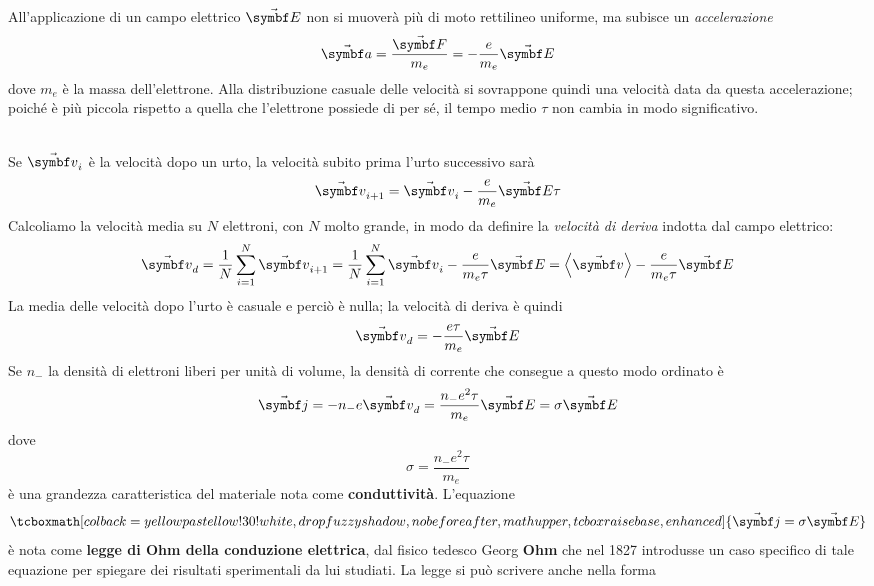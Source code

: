 \begin{minipage}{0.61\textwidth}
	 All'applicazione di un campo elettrico $\vba{E}$ non si muoverà più di moto rettilineo uniforme, ma subisce un \textit{accelerazione}
	\begin{equation*}
		\vba{a}=\frac{\vba{F}}{m_{e}}=-\frac{e}{m_{e}}\vba{E}
	\end{equation*}
	dove $m_e$ è la massa dell'elettrone. Alla distribuzione casuale delle velocità si sovrappone quindi una velocità data da questa accelerazione; poiché è più piccola rispetto a quella che l'elettrone possiede di per sé, il tempo medio $\tau$ non cambia in modo significativo.
\end{minipage}\\
 Se $\vba{v}_i$ è la velocità dopo un urto, la velocità subito prima l'urto successivo sarà
\begin{equation*}
	\vba{v}_{i+1}=\vba{v}_i-\frac{e}{m_{e}}\vba{E}\tau
\end{equation*}
Calcoliamo la velocità media su $N$ elettroni, con $N$ molto grande, in modo da definire la \textit{velocità di deriva} indotta dal campo elettrico:
\begin{equation*}
	\vba{v}_d=\frac{1}{N}\sum_{i=1}^{N}\vba{v}_{i+1}=\frac{1}{N}\sum_{i=1}^{N}\vba{v}_i-\frac{e}{m_{e}\tau}\vba{E}=\left<\vba{v}\right>-\frac{e}{m_{e}\tau}\vba{E}
\end{equation*}
La media delle velocità dopo l'urto è casuale e perciò è nulla; la velocità di deriva è quindi
\begin{equation}
	\vba{v}_d=-\frac{e\tau}{m_{e}}\vba{E}
\end{equation}
Se $n_{-}$ la densità di elettroni liberi per unità di volume, la densità di corrente che consegue a questo modo ordinato è
\begin{equation}
	\vba{j}=-n_{-}e\vba{v}_d=\frac{n_{-}e^2\tau}{m_{e}}\vba{E}=\sigma\vba{E}
\end{equation}
dove
\begin{equation*}
	\sigma=\frac{n_{-}e^2\tau}{m_{e}}
\end{equation*}
è una grandezza caratteristica del materiale nota come \textbf{conduttività}.
L'equazione
\begin{equation}
	\tcboxmath[colback=yellowpastellow!30!white,drop fuzzy shadow, nobeforeafter, math upper, tcbox raise base, enhanced]{\vba{j}=\sigma\vba{E}}
\end{equation}
è nota come \textbf{legge di Ohm della conduzione elettrica}, dal fisico tedesco Georg \textbf{Ohm} che nel 1827 introdusse un caso specifico di tale equazione per spiegare dei risultati sperimentali da lui studiati. La legge si può scrivere anche nella forma
